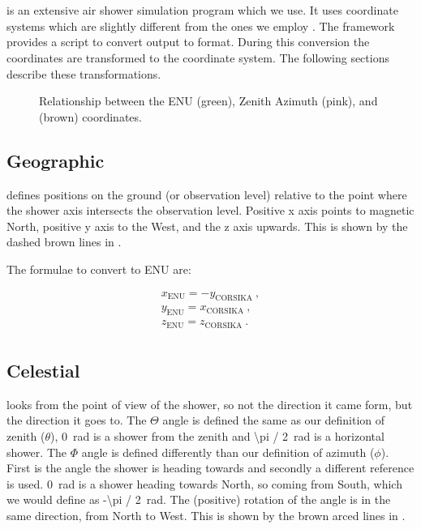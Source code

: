 \section{\corsika}
\label{sec:corsika}

\corsika is an extensive air shower simulation program which we use. It
uses coordinate systems which are slightly different from the ones we
employ \cite{heck:2013aa}. The \sapphire framework provides a script to
convert \corsika output to \hdf format. During this conversion the
coordinates are transformed to the \hisparc coordinate system. The
following sections describe these transformations.

\begin{figure}
    \centering
    
    \caption{Relationship between the ENU (green), Zenith Azimuth (pink),
             and \corsika (brown) coordinates.}
    \label{fig:enu_corsika}
\end{figure}


\subsection{Geographic}

\corsika defines positions on the ground (or observation level) relative
to the point where the shower axis intersects the observation level.
Positive x axis points to magnetic North, positive y axis to the West,
and the z axis upwards. This is shown by the dashed brown lines in
.

The formulae to convert \corsika to ENU are:

\begin{equation}
    \begin{array}{l}
        x_{\mathrm{ENU}} = -y_{\mathrm{CORSIKA}} \ , \\
        y_{\mathrm{ENU}} = x_{\mathrm{CORSIKA}} \ , \\
        z_{\mathrm{ENU}} = z_{\mathrm{CORSIKA}} \ . \\
    \end{array}
\end{equation}


\subsection{Celestial}

\corsika looks from the point of view of the shower, so not the
direction it came form, but the direction it goes to. The $\Theta$ angle
is defined the same as our definition of zenith ($\theta$),
\SI{0}{\radian} is a shower from the zenith and \SI{\pi / 2}{\radian} is
a horizontal shower. The $\Phi$ angle is defined differently than our
definition of azimuth ($\phi$). First is the angle the shower is heading
towards and secondly a different reference is used. \SI{0}{\radian} is a
shower heading towards North, so coming from South, which we would
define as \SI{-\pi / 2}{\radian}. The (positive) rotation of the angle
is in the same direction, from North to West. This is shown by the brown
arced lines in .

